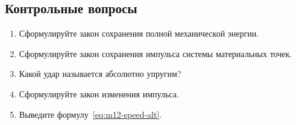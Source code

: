 \documentclass[a4paper, 12pt]{extarticle}
\begin{document}
\subsection{Контрольные вопросы}
\begin{enumerate}
\item Сформулируйте закон сохранения полной механической энергии.
\item Сформулируйте закон сохранения импульса системы материальных точек.
\item Какой удар называется абсолютно упругим?
\item Сформулируйте закон изменения импульса.
\item Выведите формулу~\eqref{eq:m12-speed-alt}.
\end{enumerate}
\end{document}
